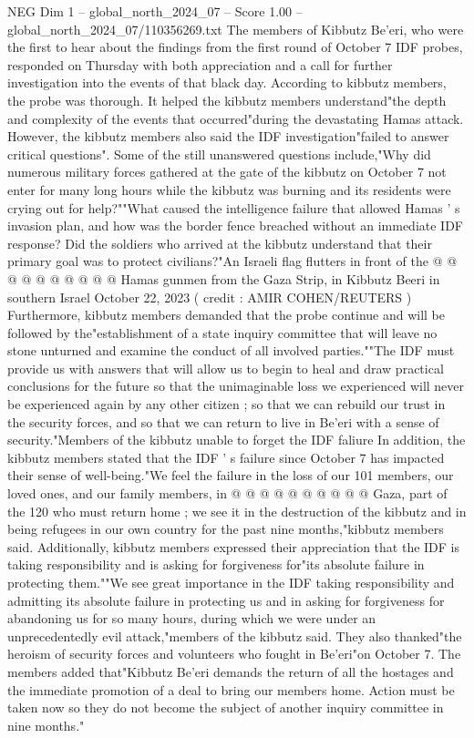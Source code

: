 \begin{textsample}{NEG Dim 1 – global\_north\_2024\_07 – Score 1.00 – global\_north\_2024\_07/110356269.txt}  \label{ex:f1_neg_269}
The members of Kibbutz Be'eri, who were the first to hear about the findings from the first round of October 7 IDF probes, responded on Thursday with both appreciation and a call for further investigation into the events of that black day.
According to kibbutz members, the probe was thorough.
It helped the kibbutz members understand"the depth and complexity of the events that occurred"during the devastating Hamas attack.
However, the kibbutz members also said the IDF investigation"failed to answer critical questions".
Some of the still unanswered questions include,"Why did numerous military forces gathered at the gate of the kibbutz on October 7 not enter for many long hours while the kibbutz was burning and its residents were crying out for help?""What caused the intelligence failure that allowed Hamas ' s invasion plan, and how was the border fence breached without an immediate IDF response?
Did the soldiers who arrived at the kibbutz understand that their primary goal was to protect civilians?"An Israeli flag flutters in front of the @ @ @ @ @ @ @ @ @ @ Hamas gunmen from the Gaza Strip, in Kibbutz Beeri in southern Israel October 22, 2023 ( credit : AMIR COHEN/REUTERS ) Furthermore, kibbutz members demanded that the probe continue and will be followed by the"establishment of a state inquiry committee that will leave no stone unturned and examine the conduct of all involved parties.""The IDF must provide us with answers that will allow us to begin to heal and draw practical conclusions for the future so that the unimaginable loss we experienced will never be experienced again by any other citizen ; so that we can rebuild our trust in the security forces, and so that we can return to live in Be'eri with a sense of security."Members of the kibbutz unable to forget the IDF faliure In addition, the kibbutz members stated that the IDF ' s failure since October 7 has impacted their sense of well-being."We feel the failure in the loss of our 101 members, our loved ones, and our family members, in @ @ @ @ @ @ @ @ @ @ Gaza, part of the 120 who must return home ; we see it in the destruction of the kibbutz and in being refugees in our own country for the past nine months,"kibbutz members said.
Additionally, kibbutz members expressed their appreciation that the IDF is taking responsibility and is asking for forgiveness for"its absolute failure in protecting them.""We see great importance in the IDF taking responsibility and admitting its absolute failure in protecting us and in asking for forgiveness for abandoning us for so many hours, during which we were under an unprecedentedly evil attack,"members of the kibbutz said.
They also thanked"the heroism of security forces and volunteers who fought in Be'eri"on October 7.
The members added that"Kibbutz Be'eri demands the return of all the hostages and the immediate promotion of a deal to bring our members home.
Action must be taken now so they do not become the subject of another inquiry committee in nine months."

\end{textsample}
